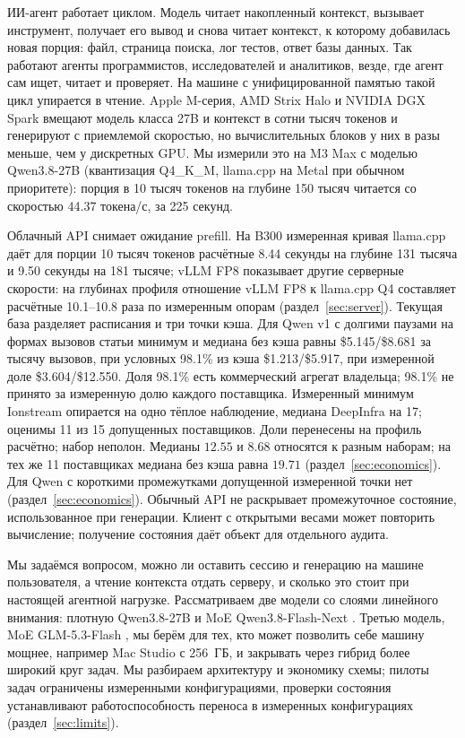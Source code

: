 ИИ-агент работает циклом. Модель читает накопленный контекст, вызывает инструмент, получает его вывод и снова
читает контекст, к которому добавилась новая порция: файл, страница поиска, лог тестов, ответ базы данных. Так
работают агенты программистов, исследователей и аналитиков, везде, где агент сам ищет, читает и проверяет. На машине с
унифицированной памятью такой цикл упирается в чтение. Apple M-серия, AMD Strix Halo и NVIDIA DGX Spark вмещают модель
класса 27B и контекст в сотни тысяч токенов и генерируют с приемлемой скоростью, но вычислительных блоков у них в разы
меньше, чем у дискретных GPU. Мы измерили это на M3 Max с моделью Qwen3.8-27B (квантизация Q4\_K\_M, llama.cpp на
Metal при обычном приоритете): порция в 10 тысяч токенов на глубине 150 тысяч читается со скоростью 44.37 токена/с, за 225 секунд.

Облачный API снимает ожидание prefill. На B300 измеренная кривая llama.cpp даёт для порции
10 тысяч токенов расчётные 8.44 секунды на глубине 131 тысяча и 9.50 секунды на 181 тысяче; vLLM FP8 показывает другие
серверные скорости: на глубинах профиля отношение vLLM FP8 к llama.cpp Q4 составляет расчётные 10.1--10.8 раза по измеренным опорам (раздел~\ref{sec:server}). Текущая база разделяет расписания и три точки кэша.
Для Qwen v1 с долгими паузами на формах вызовов статьи минимум и медиана без кэша равны \$5.145/\$8.681
за тысячу вызовов, при условных 98.1\% из кэша \$1.213/\$5.917, при измеренной доле \$3.604/\$12.550.
Доля 98.1\% есть коммерческий агрегат владельца; 98.1\% не принято за измеренную долю каждого поставщика.
Измеренный минимум Ionstream опирается на одно тёплое наблюдение, медиана DeepInfra на 17;
оценимы 11 из 15 допущенных поставщиков. Доли перенесены на профиль расчётно; набор неполон. Медианы $12.55$ и $8.68$ относятся к разным наборам;
на тех же 11 поставщиках медиана без кэша равна $19.71$ (раздел~\ref{sec:economics}).
Для Qwen с короткими промежутками допущенной измеренной точки нет (раздел~\ref{sec:economics}). Обычный API не раскрывает промежуточное состояние, использованное при генерации.
Клиент с открытыми весами может повторить вычисление; получение состояния даёт объект для отдельного аудита.

Мы задаёмся вопросом, можно ли оставить сессию и генерацию на машине пользователя, а чтение контекста отдать серверу,
и сколько это стоит при настоящей агентной нагрузке. Рассматриваем две модели со слоями линейного внимания:
плотную Qwen3.8-27B \cite{qwen38} и MoE Qwen3.8-Flash-Next \cite{qwen38flashnext}. Третью модель, MoE GLM-5.3-Flash \cite{glm53flash}, мы берём для тех, кто может позволить себе
машину мощнее, например Mac Studio с 256~ГБ, и закрывать через гибрид более широкий круг задач. Мы разбираем архитектуру и экономику схемы;
пилоты задач ограничены измеренными конфигурациями, проверки состояния устанавливают работоспособность
переноса в измеренных конфигурациях (раздел~\ref{sec:limits}).

